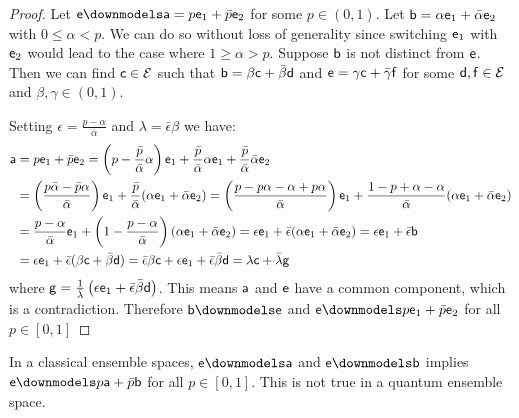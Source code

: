 \begin{proof}
	Let $\ens \distinct \ens[a] = p \ens_1 + \bar{p} \ens_2$ for some $p \in (0, 1)$. Let $\ens[b] = \alpha \ens_1 + \bar{\alpha} \ens_2$ with $0 \leq \alpha < p$. We can do so without loss of generality since switching $\ens_1$ with $\ens_2$ would lead to the case where $1 \geq \alpha > p$. Suppose $\ens[b]$ is not distinct from $\ens$. Then we can find $\ens[c] \in \Ens$ such that $\ens[b] = \beta \ens[c] + \bar{\beta} \ens[d]$ and $\ens = \gamma \ens[c] + \bar{\gamma} \ens[f]$ for some $\ens[d], \ens[f] \in \Ens$ and $\beta, \gamma \in (0, 1)$.
	
	Setting $\epsilon = \frac{p - \alpha}{\bar{\alpha}}$ and $\lambda = \bar{\epsilon} \beta$ we have:
	\begin{align*}
		\ens[a] &= p \ens_1 + \bar{p} \ens_2 = \left(p - \frac{\bar{p}}{\bar{\alpha}} \alpha \right) \ens_1 + \frac{\bar{p}}{\bar{\alpha}} \alpha \ens_1 + \frac{\bar{p}}{\bar{\alpha}} \bar{\alpha}\ens_2 \\
		&= \left(\frac{p\bar{\alpha} - \bar{p}\alpha}{\bar{\alpha}} \right) \ens_1 + \frac{\bar{p}}{\bar{\alpha}} (\alpha \ens_1 + \bar{\alpha} \ens_2) = \left(\frac{p - p\alpha - \alpha + p \alpha}{\bar{\alpha}} \right) \ens_1 + \frac{1 - p + \alpha - \alpha}{\bar{\alpha}} (\alpha \ens_1 + \bar{\alpha} \ens_2) \\
		&= \frac{p - \alpha}{\bar{\alpha}}  \ens_1 + \left( 1 - \frac{p - \alpha}{\bar{\alpha}}\right) (\alpha \ens_1 + \bar{\alpha} \ens_2) = \epsilon \ens_1 + \bar{\epsilon} (\alpha \ens_1 + \bar{\alpha} \ens_2) = \epsilon \ens_1 + \bar{\epsilon} \ens[b] \\
		&= \epsilon \ens_1 + \bar{\epsilon} ( \beta \ens[c] + \bar{\beta} \ens[d] ) = \bar{\epsilon} \beta \ens[c] + \epsilon \ens_1 + \bar{\epsilon} \bar{\beta} \ens[d] = \lambda \ens[c] + \bar{\lambda} \ens[g]
	\end{align*}
	where $\ens[g] = \frac{1}{\bar{\lambda}}\left( \epsilon \ens_1 + \bar{\epsilon} \bar{\beta} \ens[d] \right)$. This means $\ens[a]$ and $\ens$ have a common component, which is a contradiction. Therefore $\ens[b] \distinct \ens$ and $\ens \distinct p \ens_1 + \bar{p} \ens_2$ for all $p \in [0, 1]$
\end{proof}

\begin{prop}
	In a classical ensemble spaces, $\ens \distinct \ens[a]$ and $\ens \distinct \ens[b]$ implies $\ens \distinct p \ens[a] + \bar{p} \ens[b]$ for all $p \in [0,1]$. This is not true in a quantum ensemble space.
\end{prop}


